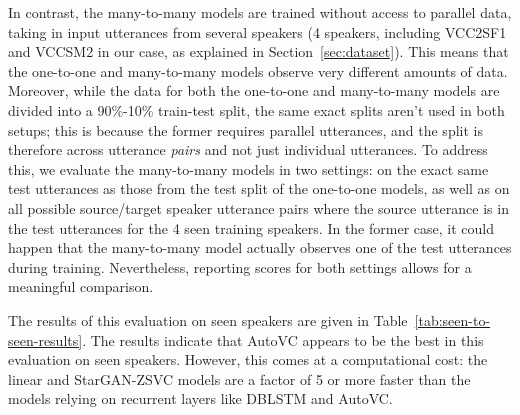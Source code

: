 In contrast, the many-to-many models are trained without access to parallel data, taking in input utterances from several speakers (4 speakers, including VCC2SF1 and VCCSM2 in our case, as explained in Section~\ref{sec:dataset}).
This means that the one-to-one and many-to-many models observe very different amounts of data.
Moreover, while the data for both the one-to-one and many-to-many models are divided into a 90\%-10\% train-test split, the same exact splits aren't used in both setups; this is because the former requires parallel utterances, and the split is therefore across utterance \textit{pairs} and not just individual utterances.
To address this, we evaluate the many-to-many models in two settings: on the exact same test utterances as those from the test split of the one-to-one models, as well as on all possible source/target speaker utterance pairs where the source utterance is in the test utterances for the 4 seen training speakers.
In the former case, it could happen that the many-to-many model actually observes one of the test utterances during training.
Nevertheless, reporting scores for both settings allows for a meaningful comparison.

The results of this evaluation on seen speakers are given in Table~\ref{tab:seen-to-seen-results}.
The results indicate that AutoVC appears to be the best in this evaluation on seen speakers.
However, this comes at a computational cost: the linear and StarGAN-ZSVC models are a factor of 5 or more faster than the models relying on recurrent layers like DBLSTM and AutoVC.

